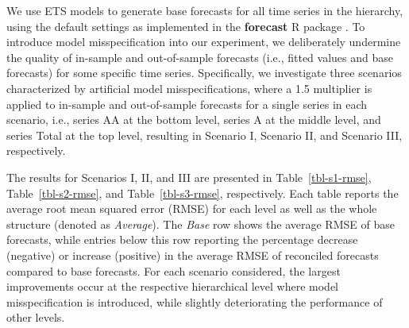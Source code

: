 \documentclass[
  12pt,
  11pt]{article}
\begin{document}
We use ETS models to generate base forecasts for all time series in the
hierarchy, using the default settings as implemented in the
\textbf{forecast} R package \citep{Hyndman2023-fc}. To introduce model
misspecification into our experiment, we deliberately undermine the
quality of in-sample and out-of-sample forecasts (i.e., fitted values
and base forecasts) for some specific time series. Specifically, we
investigate three scenarios characterized by artificial model
misspecifications, where a 1.5 multiplier is applied to in-sample and
out-of-sample forecasts for a single series in each scenario, i.e.,
series AA at the bottom level, series A at the middle level, and series
Total at the top level, resulting in Scenario I, Scenario II, and
Scenario III, respectively.

The results for Scenarios I, II, and III are presented in
Table~\ref{tbl-s1-rmse}, Table~\ref{tbl-s2-rmse}, and
Table~\ref{tbl-s3-rmse}, respectively. Each table reports the average
root mean squared error (RMSE) for each level as well as the whole
structure (denoted as \emph{Average}). The \emph{Base} row shows the
average RMSE of base forecasts, while entries below this row reporting
the percentage decrease (negative) or increase (positive) in the average
RMSE of reconciled forecasts compared to base forecasts. For each
scenario considered, the largest improvements occur at the respective
hierarchical level where model misspecification is introduced, while
slightly deteriorating the performance of other levels.
\end{document}
